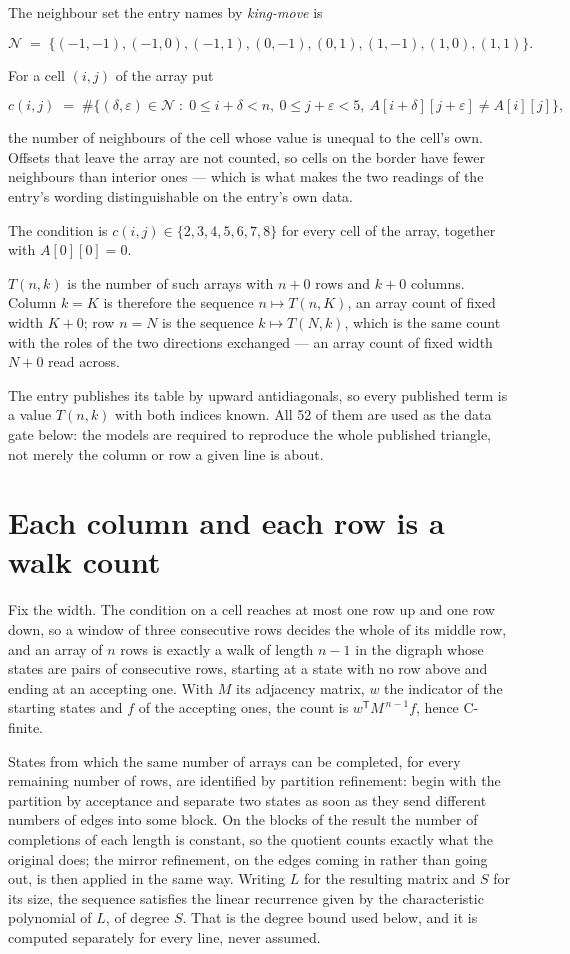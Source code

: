 \documentclass[11pt]{article}
\theoremstyle{definition}
\begin{document}
The neighbour set the entry names by {\itshape king-move} is

\[\mathcal{N} \;=\; \{(-1,-1), (-1,0), (-1,1), (0,-1), (0,1), (1,-1), (1,0), (1,1)\}.\]

For a cell $(i,j)$ of the array put

\[c(i,j) \;=\; \#\bigl\{(\delta,\varepsilon)\in\mathcal{N} \;:\; 0\le i+\delta<n,\ 0\le j+\varepsilon<5,\ A[i+\delta][j+\varepsilon] \neq A[i][j]\bigr\},\]

the number of neighbours of the cell whose value is unequal to the cell's own. Offsets that leave the array are not counted, so cells on the border have fewer neighbours than interior ones --- which is what makes the two readings of the entry's wording distinguishable on the entry's own data.

The condition is $c(i,j) \in \{2, 3, 4, 5, 6, 7, 8\}$ for every cell of the array, together with $A[0][0]=0$.

$T(n,k)$ is the number of such arrays with $n + 0$ rows and $k + 0$ columns. Column $k = K$ is therefore the sequence $n \mapsto T(n,K)$, an array count of fixed width $K + 0$; row $n = N$ is the sequence $k \mapsto T(N,k)$, which is the same count with the roles of the two directions exchanged --- an array count of fixed width $N + 0$ read across.

The entry publishes its table by upward antidiagonals, so every published term is a value $T(n,k)$ with both indices known. All 52 of them are used as the data gate below: the models are required to reproduce the whole published triangle, not merely the column or row a given line is about.

\section{Each column and each row is a walk count}

Fix the width. The condition on a cell reaches at most one row up and one row down, so a window of three consecutive rows decides the whole of its middle row, and an array of $n$ rows is exactly a walk of length $n-1$ in the digraph whose states are pairs of consecutive rows, starting at a state with no row above and ending at an accepting one. With $M$ its adjacency matrix, $w$ the indicator of the starting states and $f$ of the accepting ones, the count is $w^{\mathsf T}M^{\,n-1}f$, hence C-finite.

States from which the same number of arrays can be completed, for every remaining number of rows, are identified by partition refinement: begin with the partition by acceptance and separate two states as soon as they send different numbers of edges into some block. On the blocks of the result the number of completions of each length is constant, so the quotient counts exactly what the original does; the mirror refinement, on the edges coming in rather than going out, is then applied in the same way. Writing $L$ for the resulting matrix and $S$ for its size, the sequence satisfies the linear recurrence given by the characteristic polynomial of $L$, of degree $S$. That is the degree bound used below, and it is computed separately for every line, never assumed.
\end{document}
